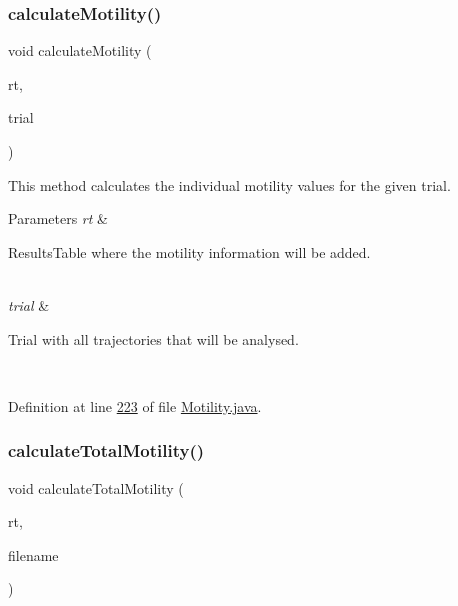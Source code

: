 \subsubsection{\texorpdfstring{calculate\+Motility()}{calculateMotility()}}
{\footnotesize\ttfamily void calculate\+Motility (\begin{DoxyParamCaption}\item[{Results\+Table}]{rt,  }\item[{\hyperlink{classdata_1_1_trial}{Trial}}]{trial }\end{DoxyParamCaption})\hspace{0.3cm}{\ttfamily [private]}}

This method calculates the individual motility values for the given trial.


\begin{DoxyParams}{Parameters}
{\em rt} & 
\begin{DoxyItemize}
\item Results\+Table where the motility information will be added. 
\end{DoxyItemize}\\
\hline
{\em trial} & 
\begin{DoxyItemize}
\item Trial with all trajectories that will be analysed. 
\end{DoxyItemize}\\
\hline
\end{DoxyParams}


Definition at line \hyperlink{_motility_8java_source_l00223}{223} of file \hyperlink{_motility_8java_source}{Motility.\+java}.

\hypertarget{classanalysis_1_1_motility_a6416a16af8e55569f37168bb76fe7174}{}\label{classanalysis_1_1_motility_a6416a16af8e55569f37168bb76fe7174} 
\subsubsection{\texorpdfstring{calculate\+Total\+Motility()}{calculateTotalMotility()}}
{\footnotesize\ttfamily void calculate\+Total\+Motility (\begin{DoxyParamCaption}\item[{Results\+Table}]{rt,  }\item[{String}]{filename }\end{DoxyParamCaption})\hspace{0.3cm}{\ttfamily [private]}}

